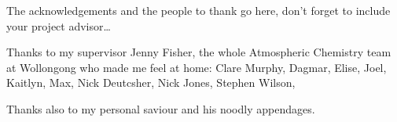 \documentclass[
11pt, %
english, %
singlespacing, %
]{MastersDoctoralThesis} %
\begin{document}







\begin{acknowledgements}
\addchaptertocentry{\acknowledgementname} %

The acknowledgements and the people to thank go here, don't forget to include your project advisor\ldots

Thanks to my supervisor Jenny Fisher, the whole Atmospheric Chemistry team at Wollongong who made me feel at home: Clare Murphy, Dagmar, Elise, Joel, Kaitlyn, Max, Nick Deutcsher, Nick Jones, Stephen Wilson, 

Thanks also to my personal saviour and his noodly appendages.

\end{acknowledgements}


\tableofcontents %
\listoffigures %
\listoftables %




\end{document}
